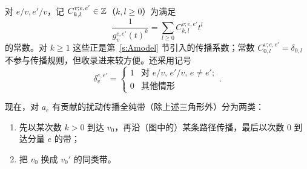 对 $e/v,e'/v$，记 $C^{v;e,e'}_{k,l}\in\mathbb{Z}$（$k,l\geq 0$）为满足
\[
\frac{1}{g_{v}^{e,e'}(t)^k}=\sum_{l\geq 0}C^{v;e,e'}_{k,l}t^{l}
\]
的常数。对 $k\geq 1$ 这些正是第~\ref{s:Amodel} 节引入的传播系数；常数 $C^{v;e,e'}_{0,l}=\delta_{0,l}$ 不参与传播规则，但收录进来较方便。还采用记号
\[
\delta_{v}^{e,e'}=\begin{cases}1 & \text{对 }e/v,\,e'/v,\,e\neq e';\\ 0 & \text{其他情形}\end{cases}.
\]

现在，对 $a_{e}$ 有贡献的扰动传播全纯带（除上述三角形外）分为两类：
\begin{enumerate}
\item[(I)] 先以某次数 $k>0$ 到达 $v_0$，再沿（图中的）某条路径传播，最后以次数 $0$ 到达分量 $e$ 的带；
\item[(II)] 把 $v_0$ 换成 $v_0'$ 的同类带。
\end{enumerate}

